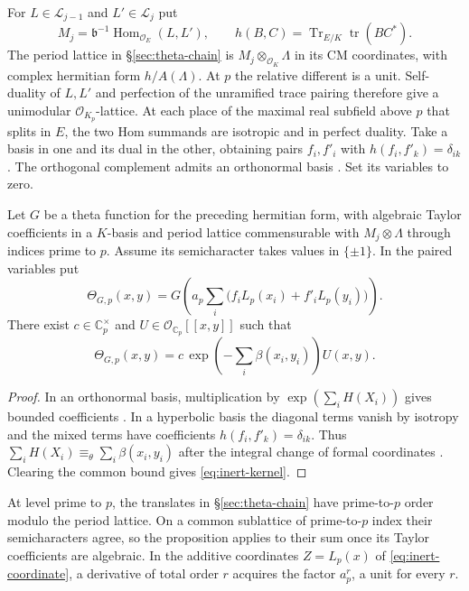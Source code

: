 For $L\in\mathcal L_{j-1}$ and $L'\in\mathcal L_j$ put
\[
  M_j=\mathfrak b^{-1}\operatorname{Hom}_{\mathcal O_E}(L,L'),\qquad
  h(B,C)=\operatorname{Tr}_{E/K}\operatorname{tr}(BC^*).
\]
The period lattice in \S\ref{sec:theta-chain} is $M_j\otimes_{\mathcal O_K}
\Lambda$ in its CM coordinates, with complex hermitian form $h/A(\Lambda)$.
At $p$ the relative different is a unit.
Self-duality of $L,L'$ and perfection of the unramified trace pairing
therefore give a unimodular $\mathcal O_{K_p}$-lattice. At each place
of the maximal real subfield above $p$ that splits in $E$, the two
Hom summands are isotropic and
in perfect duality. Take a basis in one and its dual in the other,
obtaining pairs $f_i,f'_i$ with $h(f_i,f'_k)=\delta_{ik}$.
The orthogonal complement admits an orthonormal basis
\citep[Lemma~11.43]{adriazola-grh}. Set its variables to zero.

\begin{proposition}\label{prop:inert-kernel}
Let $G$ be a theta function for the preceding hermitian form, with
algebraic Taylor coefficients in a $K$-basis and period lattice
commensurable with $M_j\otimes\Lambda$ through indices prime to $p$.
Assume its semicharacter takes values in $\{\pm1\}$. In the paired
variables put
\[
 \Theta_{G,p}(x,y)=
 G\!\left(a_p\sum_i\bigl(f_i L_p(x_i)+f'_i L_p(y_i)\bigr)\right).
\]
There exist $c\in\mathbb C_p^\times$ and
$U\in\mathcal O_{\mathbb C_p}[[x,y]]$ such that
\begin{equation}\label{eq:inert-kernel}
 \Theta_{G,p}(x,y)=c\,\exp\!\left(-\sum_i\beta(x_i,y_i)\right)U(x,y).
\end{equation}
\end{proposition}

\begin{proof}
In an orthonormal basis, multiplication by $\exp(\sum_i H(X_i))$
gives bounded coefficients \citep[Theorem~8.19]{adriazola-grh}.
In a hyperbolic basis the diagonal terms vanish by isotropy and the
mixed terms have coefficients $h(f_i,f'_k)=\delta_{ik}$.
Thus $\sum_i H(X_i)\equiv_\theta\sum_i\beta(x_i,y_i)$ after
the integral change of formal coordinates
\citep[Proposition~8.16 and Theorem~8.21]{adriazola-grh}.
Clearing the common bound gives \eqref{eq:inert-kernel}.
\end{proof}

At level prime to $p$, the translates in \S\ref{sec:theta-chain}
have prime-to-$p$ order modulo the period lattice. On a common
sublattice of prime-to-$p$ index their semicharacters agree, so the
proposition applies to their sum once its Taylor coefficients are
algebraic. In the additive coordinates $Z=L_p(x)$ of
\eqref{eq:inert-coordinate}, a derivative of total order $r$ acquires
the factor $a_p^r$, a unit for every $r$.

